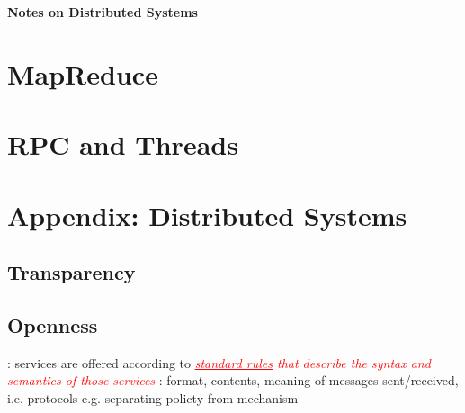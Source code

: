 \documentclass{note}
\begin{document}
\small

\begin{center}
{\large\bf \textcolor{blue2}{Notes on Distributed Systems}}
\end{center}

\vspace*{1cm}

\tableofcontents
\pagebreak


\section{MapReduce}

\section{RPC and Threads}


\section{Appendix: Distributed Systems}
\subsection{Transparency}
  \bit
  \eit
\subsection{Openness}
  \bit
  \w {}: services are offered
  according to \textcolor{red}{\textit{\underline{standard rules} that describe
      the syntax and semantics of those services}}
     \bit
     \w {}: format, contents, meaning of messages
     sent/received, 
     i.e. \textcolor{blue2}{protocols}
     \eit
  \w e.g. 
  \w \textcolor{blue2}{separating policty from mechanism}
  \eit
\end{document}
